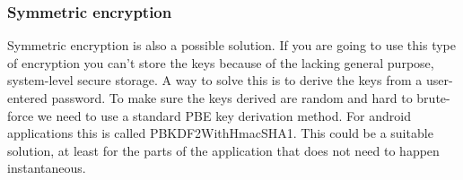 \subsubsection{Symmetric encryption}
Symmetric encryption is also a possible solution. If you are going to use this type of encryption you can’t store the keys because of the lacking general purpose, system-level secure storage. A way to solve this is to derive the keys from a user-entered password. To make sure the keys derived are random and hard to brute-force we need to use a standard PBE key derivation method. For android applications this is called PBKDF2WithHmacSHA1.
\newline
\newline
This could be a suitable solution, at least for the parts of the application that does not need to happen instantaneous. 